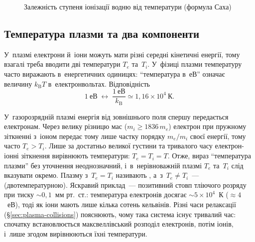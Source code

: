 
\begin{figure}[h!]\centering
	\caption{Залежність ступеня іонізації водню від температури (формула Саха)}
	\label{tikz:saha-curve}
\end{figure}



\subsection*{Температура плазми та два компоненти}



У~плазмі електрони й~іони можуть мати різні середні кінетичні енергії, тому взагалі треба
вводити дві температури $T_e$ та~$T_i$. У~фізиці плазми температуру часто виражають
в~енергетичних одиницях: \enquote{температура в~еВ} означає величину $k_{\mathrm B}T$
в~електронвольтах. Відповідність
\begin{equation*}
	1~\text{еВ}\;\longleftrightarrow\;\frac{1~\text{еВ}}{k_{\mathrm B}}\simeq1{,}16\times10^{4}~\text{К}.
\end{equation*}

У~газорозрядній плазмі енергія від зовнішнього поля спершу передається електронам. Через
велику різницю мас ($m_i\geqslant1836\,m_e$) електрон при пружному зіткненні з~іоном передає
тому лише частку порядку $m_e/m_i$ своєї енергії, тому часто $T_e>T_i$. Лише за достатньо
великої густини та тривалого часу електрон-іонні зіткнення вирівнюють температури:
$T_e=T_i=T$. Отже, вираз \enquote{температура плазми} без уточнення неоднозначний,
і~в~нерівноважній плазмі $T_e$ та~$T_i$ слід вказувати окремо. Плазму з~$T_e=T_i$
називають , а~з~$T_e\neq T_i$~--- 
(двотемпературною). Яскравий приклад~--- позитивний стовп тліючого розряду при тиску
$\sim0{,}1$~мм рт.~ст.: температура електронів досягає $\sim5\times10^4$~К
($\approx4$~еВ), тоді як іони мають лише кілька сотень кельвінів. Різні часи релаксації
(§\ref{sec:plasma-collisions}) пояснюють, чому така система існує тривалий час: спочатку
встановлюється максвеллівський розподіл електронів, потім іонів, і~лише згодом
вирівнюються їхні температури.



